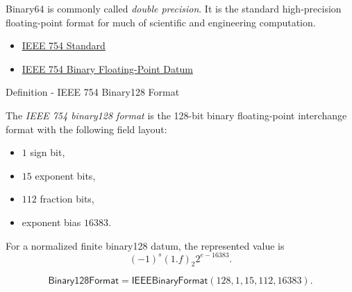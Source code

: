 \begin{remark*}[Interpretation]
Binary64 is commonly called \emph{double precision}. It is the standard high-precision
floating-point format for much of scientific and engineering computation.
\end{remark*}

\begin{remark*}[Exposition]
\end{remark*}

\begin{dependencies}
\begin{itemize}
  \item \hyperref[def:numerical-analysis-ieee-754-standard]{IEEE 754 Standard}
  \item \hyperref[def:numerical-analysis-ieee-754-binary-floating-point-datum]{IEEE 754 Binary Floating-Point Datum}
\end{itemize}
\end{dependencies}


\begin{definitionbox}{Definition - IEEE 754 Binary128 Format}
\begin{definition}
\label{def:numerical-analysis-ieee-754-binary128-format}
The \emph{IEEE 754 binary128 format} is the 128-bit binary floating-point interchange format
with the following field layout:

\begin{itemize}
    \item $1$ sign bit,
    \item $15$ exponent bits,
    \item $112$ fraction bits,
    \item exponent bias $16383$.
\end{itemize}

For a normalized finite binary128 datum, the represented value is
\[
(-1)^s (1.f)_2 2^{e-16383}.
\]
\end{definition}
\end{definitionbox}

\begin{remark*}
\[
\mathsf{Binary128Format}
=\mathsf{IEEEBinaryFormat}(128,1,15,112,16383).
\]
\end{remark*}

